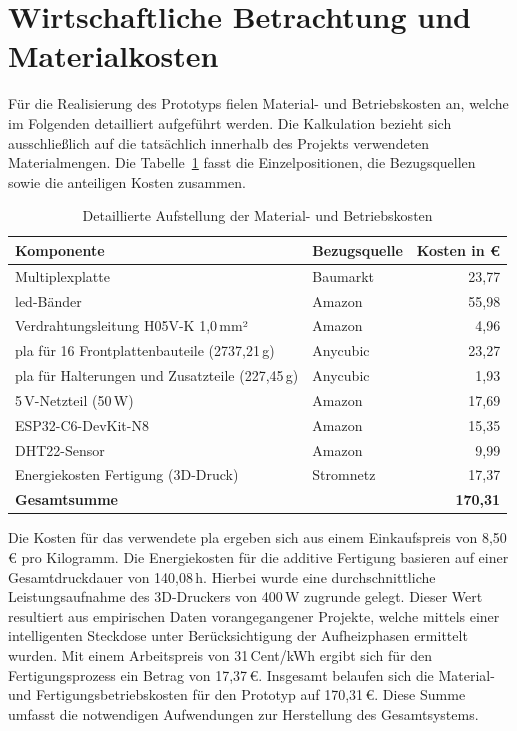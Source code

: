 \section{Wirtschaftliche Betrachtung und Materialkosten}
Für die Realisierung des Prototyps fielen Material- und Betriebskosten an, welche im Folgenden detailliert aufgeführt werden.
Die Kalkulation bezieht sich ausschließlich auf die tatsächlich innerhalb des Projekts verwendeten Materialmengen.
Die Tabelle~\ref{tab:materialkosten} fasst die Einzelpositionen, die Bezugsquellen sowie die anteiligen Kosten zusammen.

\begin{table}[h]
\centering
\setlength{\tabcolsep}{12pt} %
\renewcommand{\arraystretch}{1.2} %
\caption{Detaillierte Aufstellung der Material- und Betriebskosten}
\label{tab:materialkosten}
\begin{tabular}{llr}
\hline
\textbf{Komponente} & \textbf{Bezugsquelle} & \textbf{Kosten in €} \\ \hline
Multiplexplatte & Baumarkt & 23,77 \\ 
\gls{led}-Bänder & Amazon & 55,98 \\ 
Verdrahtungsleitung H05V-K 1,0\,mm² & Amazon & 4,96 \\ 
\gls{pla} für 16 Frontplattenbauteile (2737,21\,g) & Anycubic & 23,27 \\ 
\gls{pla} für Halterungen und Zusatzteile (227,45\,g) & Anycubic & 1,93 \\ 
5\,V-Netzteil (50\,W) & Amazon & 17,69 \\ 
ESP32-C6-DevKit-N8 & Amazon & 15,35 \\ 
DHT22-Sensor & Amazon & 9,99 \\ 
Energiekosten Fertigung (3D-Druck) & Stromnetz & 17,37 \\ \hline
\textbf{Gesamtsumme} & & \textbf{170,31} \\ \hline
\end{tabular}
\end{table}

Die Kosten für das verwendete \gls{pla} ergeben sich aus einem Einkaufspreis von 8,50\,€ pro Kilogramm.
Die Energiekosten für die additive Fertigung basieren auf einer Gesamtdruckdauer von 140,08\,h.
Hierbei wurde eine durchschnittliche Leistungsaufnahme des 3D-Druckers von 400\,W zugrunde gelegt.
Dieser Wert resultiert aus empirischen Daten vorangegangener Projekte, welche mittels einer intelligenten Steckdose unter Berücksichtigung der Aufheizphasen ermittelt wurden.
Mit einem Arbeitspreis von 31\,Cent/kWh ergibt sich für den Fertigungsprozess ein Betrag von 17,37\,€.
Insgesamt belaufen sich die Material- und Fertigungsbetriebskosten für den Prototyp auf 170,31\,€.
Diese Summe umfasst die notwendigen Aufwendungen zur Herstellung des Gesamtsystems.

